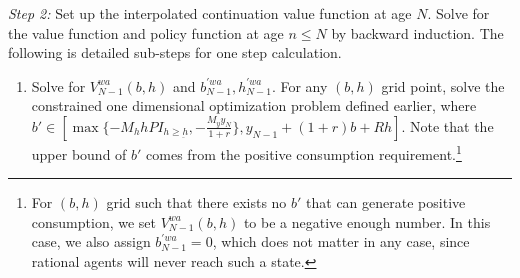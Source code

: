 \documentclass[a4paper,10pt]{article}
\begin{document}
\noindent \emph{Step 2:} Set up the interpolated continuation value function at age $N$. Solve for the value function and policy function at age $n\le N$ by backward induction. The following is detailed sub-steps for one step calculation.
\begin{enumerate}

  \item Solve for $V_{N-1}^{wa}(b,h)$ and $b^{'wa}_{N-1},h^{'wa}_{N-1}$. For any $(b,h)$ grid point, solve the constrained one dimensional optimization problem defined earlier, where $b'\in[\max \{-M_h hPI_{h\ge\underbar{h}}, -\frac{M_y y_N}{1+r}\}, y_{N-1}+(1+r)b+Rh]$. Note that the upper bound of $b'$ comes from the positive consumption requirement.\footnote{For $(b,h)$ grid such that there exists no $b'$ that can generate positive consumption, we set $V_{N-1}^{wa}(b,h)$ to be a negative enough number. In this case, we also assign $b^{'wa}_{N-1}=0$, which does not matter in any case, since rational agents will never reach such a state.}


\end{enumerate}
\end{document}
